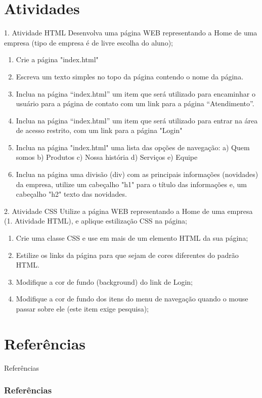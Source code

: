 \documentclass{beamer}
\begin{document}
\section{Atividades}
\begin{frame}{1. Atividade HTML}
\small
Desenvolva uma página WEB representando a Home de uma empresa (tipo de empresa é de livre escolha do aluno);

\begin{enumerate}
 \item Crie a página "index.html"
  \item Escreva um texto simples no topo da página contendo o nome da página.
  \item Inclua na página “index.html” um item que será utilizado para encaminhar o usuário para a página de contato com um link para a página “Atendimento”. 
  \item Inclua na página “index.html” um item que será utilizado para 
entrar na área de acesso restrito, com um link para a página "Login"
  \item Inclua na página "index.html" uma lista das opções de navegação: a) Quem somos b) Produtos c) Nossa história d) Serviços e) Equipe 
  \item Inclua na página uma divisão (div) com as principais informações (novidades) da empresa, utilize um cabeçalho "h1" para o título das informações e, um cabeçalho "h2" texto das novidades.
\end{enumerate}

\end{frame}
\begin{frame}{2. Atividade CSS}
\small
Utilize a página WEB representando a Home de uma empresa (1. Atividade HTML), e aplique estilização CSS na página; 

\begin{enumerate}
 \item Crie uma classe CSS e use em mais de um elemento HTML da sua página;
  \item Estilize os links da página para que sejam de cores diferentes do padrão HTML. 
  \item Modifique a cor de fundo (background) do link de Login;
  \item Modifique a cor de fundo dos itens do menu de navegação quando o mouse passar sobre ele (este item exige pesquisa);
\end{enumerate}

\end{frame}
\section{Referências}
\begin{frame}{Referências}%
\frametitle{Referências}
\small
\begin{center}
\tiny


\end{center}
\end{frame}
 
\end{document}

